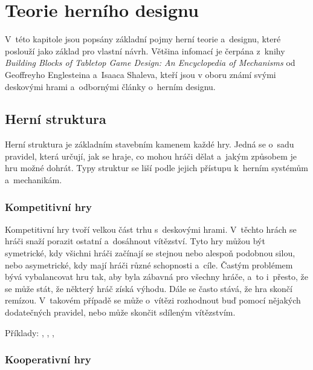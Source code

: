 \chapter{Teorie herního designu}
\label{chap:game_design}

V~této kapitole jsou popsány základní pojmy herní teorie a~designu, které poslouží jako základ pro vlastní návrh. Většina infomací je čerpána z~knihy \textit{Building Blocks of Tabletop Game Design: An Encyclopedia of Mechanisms} od Geoffreyho Englesteina a~Isaaca Shaleva, kteří jsou v oboru známí svými deskovými hrami a~odbornými články o~herním designu. 
\cite{building_blocks_of_tabletop_design_2022}



\section{Herní struktura}
\label{sec:structure}

Herní struktura je základním stavebním kamenem každé hry. Jedná se o~sadu pravidel, která určují, jak se hraje, co mohou hráči dělat a~jakým způsobem je hru možné dohrát. Typy struktur se liší podle jejich přístupu k~herním systémům a~mechanikám. 

\subsection{Kompetitivní hry}
\label{subsec:structure_competitive}

Kompetitivní hry tvoří velkou část trhu s~deskovými hrami. V~těchto hrách se hráči snaží porazit ostatní a~dosáhnout vítězství. Tyto hry můžou být symetrické, kdy všichni hráči začínají se stejnou nebo alespoň podobnou silou, nebo asymetrické, kdy mají hráči různé schopnosti a~cíle. Častým problémem bývá vybalancovat hru tak, aby byla zábavná pro všechny hráče, a~to i~přesto, že se může stát, že některý hráč získá výhodu. Dále se často stává, že hra skončí remízou. V~takovém případě se může o~vítězi rozhodnout buď pomocí nějakých dodatečných pravidel, nebo může skončit sdíleným vítězstvím.

Příklady: , , , 

\subsection{Kooperativní hry}
\label{subsec:structure_cooperative}

